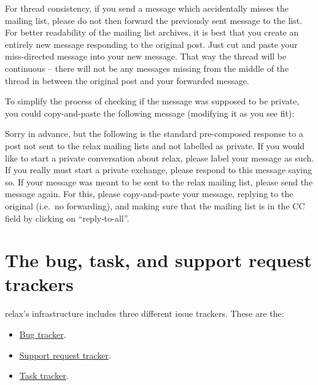 For thread consistency, if you send a message which accidentally misses the mailing list, please do not then forward the previously sent message to the list.
For better readability of the mailing list archives, it is best that you create an entirely new message responding to the original post.
Just cut and paste your miss-directed message into your new message.
That way the thread will be continuous -- there will not be any messages missing from the middle of the thread in between the original post and your forwarded message.

To simplify the process of checking if the message was supposed to be private, you could copy-and-paste the following message (modifying it as you see fit):

\begin{exampleenv}
Sorry in advance, but the following is the standard pre-composed response to a post not sent to the relax mailing lists and not labelled as private.  If you would like to start a private conversation about relax, please label your message as such.  If you really must start a private exchange, please respond to this message saying so.  If your message was meant to be sent to the relax mailing list, please send the message again.  For this, please copy-and-paste your message, replying to the original (i.e.\ no forwarding), and making sure that the mailing list is in the CC field by clicking on ``reply-to-all''.
\end{exampleenv}





\section{The bug, task, and support request trackers}

relax's infrastructure includes three different issue trackers.
These are the:
\begin{itemize}
    \item \href{\relaxBugTrackerURL}{Bug tracker}.
    \item \href{\relaxSRTrackerURL}{Support request tracker}.
    \item \href{\relaxTaskTrackerURL}{Task tracker}.
\end{itemize}


